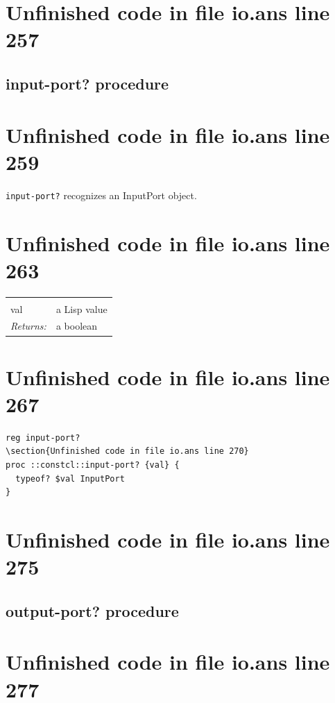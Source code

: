 \documentclass[twoside,9pt]{report}
\begin{document}
\section{Unfinished code in file io.ans line 257}
\subsection{input-port? procedure}
\label{input-port?-procedure}
\section{Unfinished code in file io.ans line 259}


\texttt{input-port?} recognizes an InputPort object.

\section{Unfinished code in file io.ans line 263}
\noindent\begin{tabular}{ |p{1.9cm} p{8cm}| }
\hline
\rowcolor[HTML]{CCCCCC} \multicolumn{2}{|l|}{\bf input-port? (public)} \\
val & a Lisp value \\
\textit{Returns:} & a boolean \\
\hline
\end{tabular}
\section{Unfinished code in file io.ans line 267}
\begin{lstlisting}
reg input-port?
\section{Unfinished code in file io.ans line 270}
proc ::constcl::input-port? {val} {
  typeof? $val InputPort
}
\end{lstlisting}
\section{Unfinished code in file io.ans line 275}
\subsection{output-port? procedure}
\label{output-port?-procedure}
\section{Unfinished code in file io.ans line 277}
\end{document}
